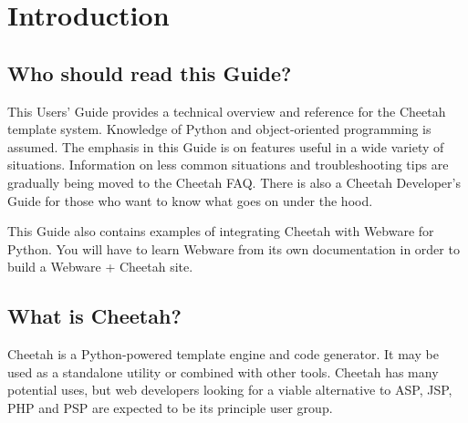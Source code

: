 \section{Introduction}
\label{intro}

\subsection{Who should read this Guide?}
\label{intro.whoShouldRead}

This Users' Guide provides a technical overview and reference for the
Cheetah template system.  Knowledge of Python and object-oriented programming
is assumed.  The emphasis in this Guide is on features useful in a wide variety
of situations.  Information on less common situations and troubleshooting tips
are gradually being moved to the Cheetah FAQ.  There is also a Cheetah
Developer's Guide for those who want to know what goes on under the hood.


This Guide also contains examples of integrating Cheetah with Webware for
Python.  You will have to learn Webware from its own documentation in order to
build a Webware + Cheetah site.

\subsection{What is Cheetah?}
\label{intro.whatIs}

Cheetah is a Python-powered template engine and code generator.  It may be used
as a standalone utility or combined with other tools.  Cheetah has
many potential uses, but web developers looking for a viable alternative to ASP,
JSP, PHP and PSP are expected to be its principle user group.

